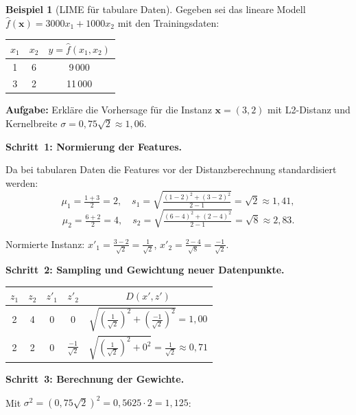 ﻿\documentclass[a4paper,12pt]{article}
\theoremstyle{definition}
\newtheorem{beispiel}{Beispiel}[section]
\begin{document}
\begin{beispiel}[LIME für tabulare Daten]
  \label{bsp:lime_tabular}
  Gegeben sei das lineare Modell $\hat{f}(\mathbf{x}) = 3000 x_1 + 1000 x_2$ mit den
  Trainingsdaten:
  \begin{center}
  \begin{tabular}{@{}ccc@{}}
    \toprule
    $x_1$ & $x_2$ & $y = \hat{f}(x_1, x_2)$ \\
    \midrule
    1 & 6 & 9\,000 \\
    3 & 2 & 11\,000 \\
    \bottomrule
  \end{tabular}
  \end{center}

  \textbf{Aufgabe:} Erkläre die Vorhersage für die Instanz $\mathbf{x} = (3, 2)$ mit
  L2-Distanz und Kernelbreite $\sigma = 0{,}75\sqrt{2} \approx 1{,}06$.

  \textbf{Schritt~1: Normierung der Features.}

  Da bei tabularen Daten die Features vor der Distanzberechnung standardisiert werden:
  \[
    \mu_1 = \tfrac{1+3}{2} = 2, \quad
    s_1 = \sqrt{\tfrac{(1-2)^2+(3-2)^2}{2-1}} = \sqrt{2} \approx 1{,}41,
  \]
  \[
    \mu_2 = \tfrac{6+2}{2} = 4, \quad
    s_2 = \sqrt{\tfrac{(6-4)^2+(2-4)^2}{2-1}} = \sqrt{8} \approx 2{,}83.
  \]

  Normierte Instanz:
  $x'_1 = \frac{3-2}{\sqrt{2}} = \frac{1}{\sqrt{2}}$, \quad
  $x'_2 = \frac{2-4}{\sqrt{8}} = \frac{-1}{\sqrt{2}}$.

  \textbf{Schritt~2: Sampling und Gewichtung neuer Datenpunkte.}

  \begin{center}
  \begin{tabular}{@{}ccccc@{}}
    \toprule
    $z_1$ & $z_2$ & $z'_1$ & $z'_2$ & $D(x', z')$ \\
    \midrule
    2 & 4 & $0$ & $0$ &
    $\sqrt{\left(\tfrac{1}{\sqrt{2}}\right)^2 + \left(\tfrac{-1}{\sqrt{2}}\right)^2}
     = 1{,}00$ \\[4pt]
    2 & 2 & $0$ & $\tfrac{-1}{\sqrt{2}}$ &
    $\sqrt{\left(\tfrac{1}{\sqrt{2}}\right)^2 + 0^2}
     = \tfrac{1}{\sqrt{2}} \approx 0{,}71$ \\
    \bottomrule
  \end{tabular}
  \end{center}

  \textbf{Schritt~3: Berechnung der Gewichte.}

  Mit $\sigma^2 = (0{,}75\sqrt{2})^2 = 0{,}5625 \cdot 2 = 1{,}125$:


\end{beispiel}
\end{document}
